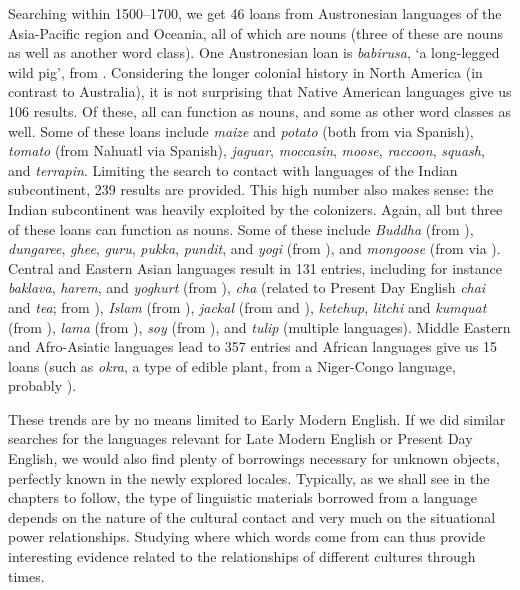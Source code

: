 Searching within 1500--1700, we get 46 loans from Austronesian languages of the Asia-Pacific region and Oceania, all of which are nouns (three of these are nouns as well as another word class). One Austronesian loan is \textit{babirusa}, `a long-legged wild pig', from . Considering the longer colonial history in North America (in contrast to Australia), it is not surprising that Native American languages give us 106 results. Of these, all can function as nouns, and some as other word classes as well. Some of these loans include \emph{maize} and \emph{potato} (both from  via Spanish), \emph{tomato} (from Nahuatl via Spanish), \textit{jaguar}, \textit{moccasin}, \textit{moose}, \textit{raccoon}, \textit{squash}, and \textit{terrapin}. Limiting the search to contact with languages of the Indian subcontinent, 239 results are provided. This high number also makes sense: the Indian subcontinent was heavily exploited by the colonizers. Again, all but three of these loans can function as nouns. Some of these include \textit{Buddha} (from ), \textit{dungaree}, \textit{ghee}, \textit{guru}, \textit{pukka}, \textit{pundit}, and \textit{yogi} (from ), and \textit{mongoose} (from  via ). Central and Eastern Asian languages result in 131 entries, including for instance \textit{baklava}, \textit{harem}, and \textit{yoghurt} (from ), \textit{cha} (related to Present Day English \textit{chai} and \textit{tea}; from ), \textit{Islam} (from ), \textit{jackal} (from  and ), \textit{ketchup}, \textit{litchi} and \textit{kumquat} (from ), \textit{lama} (from ), \textit{soy} (from ), and \textit{tulip} (multiple languages). Middle Eastern and Afro-Asiatic languages lead to 357 entries and African languages give us 15 loans (such as \textit{okra}, a type of edible plant, from a Niger-Congo language, probably ).

These trends are by no means limited to Early Modern English. If we did similar searches for the languages relevant for Late Modern English or Present Day English, we would also find plenty of borrowings necessary for unknown objects, perfectly known in the newly explored locales. Typically, as we shall see in the chapters to follow, the type of linguistic materials borrowed from a language depends on the nature of the cultural contact and very much on the situational power relationships. Studying where which words come from can thus provide interesting evidence related to the relationships of different cultures through times.


